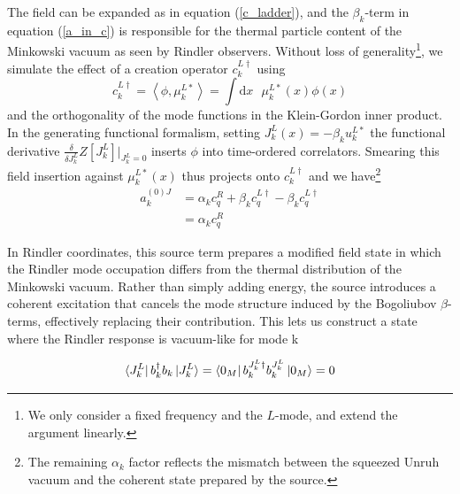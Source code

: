 \documentclass[12pt,a4paper]{article}
\newcommand{\dv}[1]{\mathrm{d} #1 \text{ }}
\begin{document}
The field can be expanded as in equation (\ref{c_ladder}), and the $\beta_k$-term in equation (\ref{a_in_c}) is responsible for the thermal particle content of the Minkowski vacuum as seen by Rindler observers. Without loss of generality\footnote{We only consider a fixed frequency and the $L$-mode, and extend the argument linearly.}, we simulate the effect of a creation operator $c_k^{L \dagger}$ using
\begin{equation}
  c _k^{L\dagger} = \left<\phi, \mu_k^{L*}\right> = \int \dv{x} \mu_k^{L*}(x) \phi(x)
\end{equation}
and the orthogonality of the mode functions in the Klein-Gordon inner product. In the generating functional formalism, setting $J_k^L(x) = -\beta_k u_k^{L*}$ the functional derivative $\frac{\delta}{\delta J_k^L}Z[J_k^L]|_{J_k^L=0}$ inserts $\phi$ into time-ordered correlators. Smearing this field insertion against $\mu_k^{L*}(x)$ thus projects onto $c_k^{L\dagger}$ and we have\footnote{The remaining $\alpha_k$ factor reflects the mismatch between the squeezed Unruh vacuum and the coherent state prepared by the source.}
\begin{equation}
\begin{array}{ll}
  a_k^{(0)J} &= \alpha_k c_q^R + \beta_k c_q^{L\dagger} -  \beta_k c_q^{L\dagger} \\
  &= \alpha_k c_q^R
\end{array}
\end{equation}

In Rindler coordinates, this source term prepares a modified field state in which the Rindler mode occupation differs from the thermal distribution of the Minkowski vacuum. Rather than simply adding energy, the source introduces a coherent excitation that cancels the mode structure induced by the Bogoliubov $\beta$-terms, effectively replacing their contribution. This lets us construct a state where the Rindler response is vacuum-like for mode k

\begin{equation}
  \bra{J_k^L}  b_k^{\dagger} b_k \ket{J_k^L} = \bra{0_M}  b_k^{J_k^L \dagger} b^{J_k^L}_k \ket{0_M} = 0
\end{equation}
\end{document}
